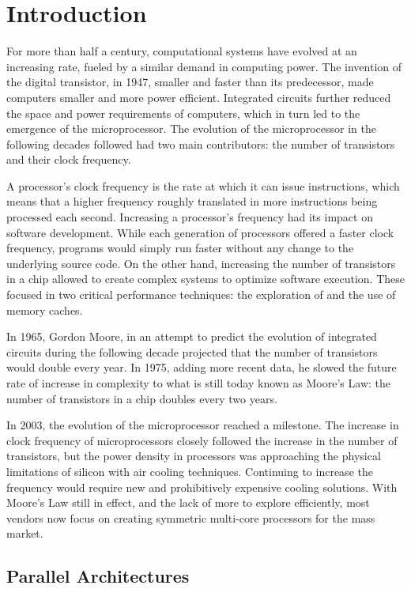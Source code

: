 \documentclass[../thesis]{subfiles}
\begin{document}
	\chapter{Introduction}
	For more than half a century, computational systems have evolved at an increasing rate, fueled by a similar demand in computing power. The invention of the digital transistor, in 1947, smaller and faster than its predecessor, made computers smaller and more power efficient. Integrated circuits further reduced the space and power requirements of computers, which in turn led to the emergence of the microprocessor. The evolution of the microprocessor in the following decades followed had two main contributors: the number of transistors and their clock frequency.

	A processor's clock frequency is the rate at which it can issue instructions, which means that a higher frequency roughly translated in more instructions being processed each second. Increasing a processor's frequency had its impact on software development. While each generation of processors offered a faster clock frequency, programs would simply run faster without any change to the underlying source code. On the other hand, increasing the number of transistors in a chip allowed to create complex systems to optimize software execution. These focused in two critical performance techniques: the exploration of \ilp and the use of memory caches.

	In 1965, Gordon Moore, in an attempt to predict the evolution of integrated circuits during the following decade projected that the number of transistors would double every year. In 1975, adding more recent data, he slowed the future rate of increase in complexity to what is still today known as Moore's Law: the number of transistors in a chip doubles every two years.

	In 2003, the evolution of the microprocessor reached a milestone. The increase in clock frequency of microprocessors closely followed the increase in the number of transistors, but the power density in processors was approaching the physical limitations of silicon with air cooling techniques. Continuing to increase the frequency would require new and prohibitively expensive cooling solutions. With Moore's Law still in effect, and the lack of more \ilp to explore efficiently, most vendors now focus on creating symmetric multi-core processors for the mass market.


	\section{Parallel Architectures}
\end{document}
